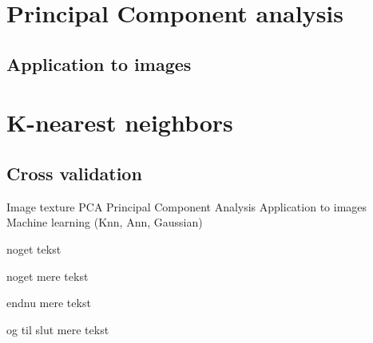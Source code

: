 \section{Principal Component analysis}

\subsection{Application to images}

\section{K-nearest neighbors}

\subsection{Cross validation}




Image texture
PCA
Principal Component Analysis Application to images
Machine learning (Knn, Ann, Gaussian)


\small
noget tekst 

noget mere tekst 

endnu mere tekst 

og til slut mere tekst 
